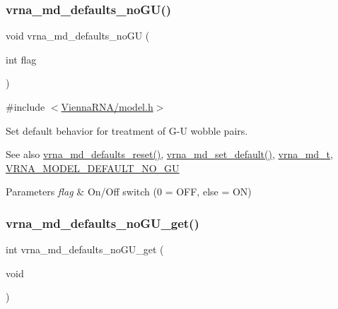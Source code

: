 \subsubsection{\texorpdfstring{vrna\_md\_defaults\_noGU()}{vrna\_md\_defaults\_noGU()}}
{\footnotesize\ttfamily void vrna\+\_\+md\+\_\+defaults\+\_\+no\+GU (\begin{DoxyParamCaption}\item[{int}]{flag }\end{DoxyParamCaption})}



{\ttfamily \#include $<$\mbox{\hyperlink{model_8h}{Vienna\+R\+N\+A/model.\+h}}$>$}



Set default behavior for treatment of G-\/U wobble pairs. 

\begin{DoxySeeAlso}{See also}
\mbox{\hyperlink{group__model__details_ga70834424cf804d149937de89f80ceb45}{vrna\+\_\+md\+\_\+defaults\+\_\+reset()}}, \mbox{\hyperlink{group__model__details_ga8ac6ff84936282436f822644bf841f66}{vrna\+\_\+md\+\_\+set\+\_\+default()}}, \mbox{\hyperlink{group__model__details_ga1f8a10e12a0a1915f2a4eff0b28ea17c}{vrna\+\_\+md\+\_\+t}}, \mbox{\hyperlink{group__model__details_ga34702f7d14d38b877ba8e475281e97e2}{V\+R\+N\+A\+\_\+\+M\+O\+D\+E\+L\+\_\+\+D\+E\+F\+A\+U\+L\+T\+\_\+\+N\+O\+\_\+\+GU}} 
\end{DoxySeeAlso}

\begin{DoxyParams}{Parameters}
{\em flag} & On/\+Off switch (0 = O\+FF, else = ON) \\
\hline
\end{DoxyParams}
\mbox{\label{group__model__details_ga5faa7d4e536d7fe36ec25428c0cf2563}} 
\subsubsection{\texorpdfstring{vrna\_md\_defaults\_noGU\_get()}{vrna\_md\_defaults\_noGU\_get()}}
{\footnotesize\ttfamily int vrna\+\_\+md\+\_\+defaults\+\_\+no\+G\+U\+\_\+get (\begin{DoxyParamCaption}\item[{void}]{ }\end{DoxyParamCaption})}



